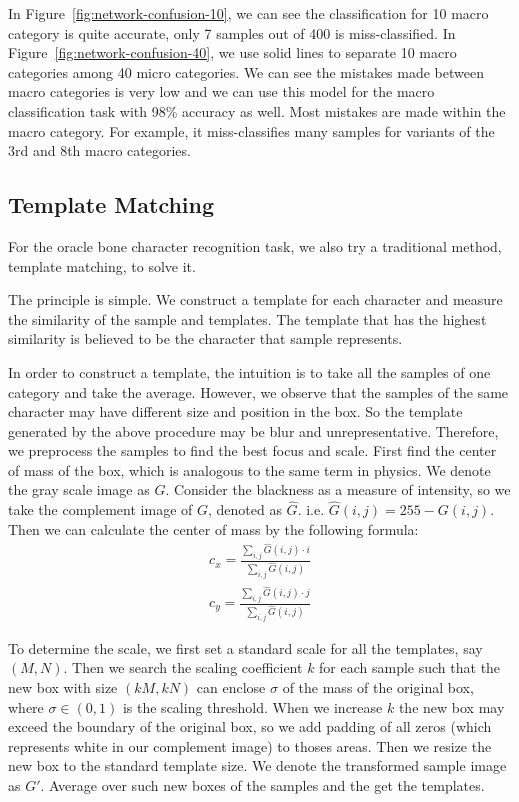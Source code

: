 \documentclass[journal]{IEEEtran}
\begin{document}
In Figure~\ref{fig:network-confusion-10}, we can see the classification for 10 macro category is quite accurate, only 7 samples out of 400 is miss-classified.
In Figure~\ref{fig:network-confusion-40}, we use solid lines to separate 10 macro categories among 40 micro categories.
We can see the mistakes made between macro categories is very low and we can use this model for the macro classification task with 98\% accuracy as well.
Most mistakes are made within the macro category.
For example, it miss-classifies many samples for variants of the 3rd and 8th macro categories.

\subsection{Template Matching}
For the oracle bone character recognition task, we also try a traditional method, template matching, to solve it. 

The principle is simple. We construct a template for each character and measure the similarity of the sample and templates. The template that has the highest similarity is believed to be the character that sample represents.

In order to construct a template, the intuition is to take all the samples of one category and take the average. However, we observe that the samples of the same character may have different size and position in the box. So the template generated by the above procedure may be blur and unrepresentative. Therefore, we preprocess the samples to find the best focus and scale. First find the center of mass of the box, which is analogous to the same term in physics. We denote the gray scale image as $G$. Consider the blackness as a measure of intensity, so we take the complement image of $G$, denoted as $\hat{G}$. i.e. $\hat{G}(i,j)=255-G(i,j)$. Then we can calculate the center of mass by the following formula:
\begin{align*}
	c_x=\frac{\sum_{i,j}\hat{G}(i,j)\cdot i}{\sum_{i,j} \hat{G}(i,j)}\\
	c_y=\frac{\sum_{i,j}\hat{G}(i,j)\cdot j}{\sum_{i,j} \hat{G}(i,j)}
\end{align*}

To determine the scale, we first set a standard scale for all the templates, say $(M,N)$. Then we search the scaling coefficient $k$ for each sample such that the new box with size $(kM,kN)$ can enclose $\sigma$ of the mass of the original box, where $\sigma\in (0,1)$ is the scaling threshold. When we increase $k$ the new box may exceed the boundary of the original box, so we add padding of all zeros (which represents white in our complement image) to thoses areas. Then we resize the new box to the standard template size. We denote the transformed sample image as $G'$. Average over such new boxes of the samples and the get the templates.
\end{document}
